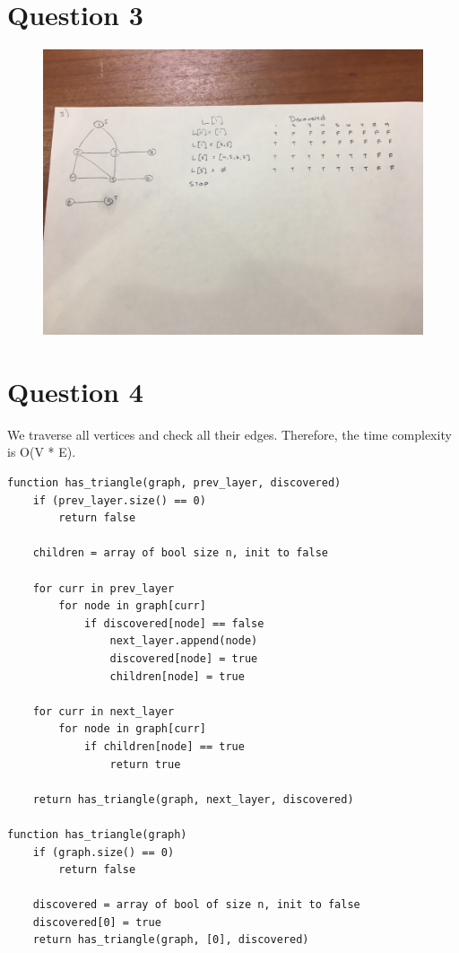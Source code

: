 \documentclass[11pt, oneside]{article}
\begin{document}
\section{Question 3}
\begin{figure}[ht]
\begin{center}
\includegraphics[width=\linewidth]{IMG_3161.JPG}
\end{center}
\end{figure}
\clearpage

\section{Question 4}

We traverse all vertices and check all their edges. Therefore, the time complexity is O(V * E).

\begin{lstlisting}
function has_triangle(graph, prev_layer, discovered)
    if (prev_layer.size() == 0)
        return false

    children = array of bool size n, init to false

    for curr in prev_layer
        for node in graph[curr]
            if discovered[node] == false
                next_layer.append(node)
                discovered[node] = true
                children[node] = true

    for curr in next_layer
        for node in graph[curr]
            if children[node] == true
                return true

    return has_triangle(graph, next_layer, discovered)

function has_triangle(graph)
    if (graph.size() == 0)
        return false

    discovered = array of bool of size n, init to false
    discovered[0] = true
    return has_triangle(graph, [0], discovered)
\end{lstlisting}
\end{document}
